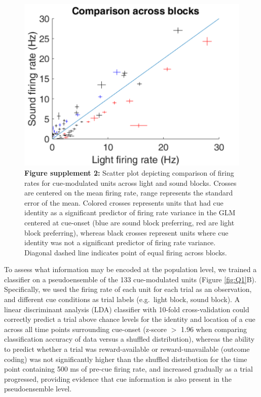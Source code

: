\documentclass[11pt]{article}
\newcommand{\bsf}[1]{\textbf{#1}}
\begin{document}
 \begin{figure}[ht!]
\centering
\includegraphics[height=0.3\textheight]{Fig 5 - SUPP scatter.pdf}
\caption*{\bsf{Figure supplement 2:} Scatter plot depicting comparison
  of firing rates for cue-modulated units across light and sound
  blocks. Crosses are centered on the mean firing rate, range
  represents the standard error of the mean. Colored crosses represents units that had cue
  identity as a significant predictor of firing rate variance in the GLM centered at cue-onset (blue
  are sound block preferring, red are light block preferring), whereas
  black crosses represent units where cue identity was not a
  significant predictor of firing rate variance. Diagonal dashed line
  indicates point of equal firing across blocks.}
\label{fig:Q1SUPP2}
\end{figure} \clearpage

To assess what information may be encoded at the population level, we trained a classifier on a pseudoensemble of the 133 cue-modulated units (Figure \ref{fig:Q1}B). Specifically, we used the firing rate of each unit for each trial as an observation, and different cue conditions as trial labels (e.g.\ light block, sound block). A linear discriminant analysis (LDA) classifier with 10-fold cross-validation could correctly predict a trial above chance levels for the identity and location of a cue across all time points surrounding cue-onset (z-score $>$ 1.96 when comparing classification accuracy of data versus a shuffled distribution), whereas the ability to predict whether a trial was reward-available or reward-unavailable (outcome coding) was not significantly higher than the shuffled distribution for the time point containing 500 ms of pre-cue firing rate, and increased gradually as a trial progressed, providing evidence that cue information is also present in the pseudoensemble level.
\end{document}
